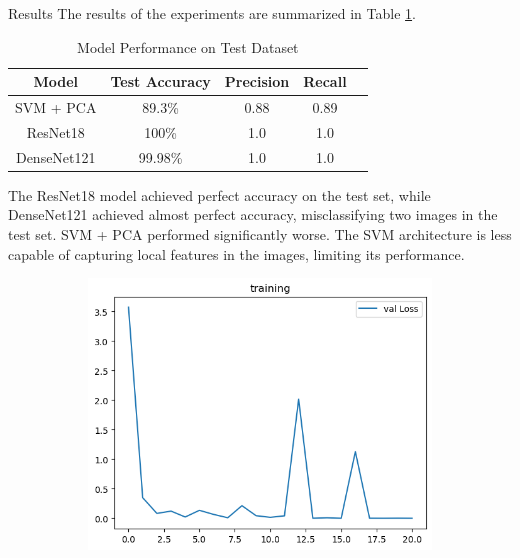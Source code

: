 \documentclass[12pt, a4paper]{article}
\begin{document}
\begin{section}{Results}
    The results of the experiments are summarized in Table \ref{tab:results}. 
    \begin{table}[H]
        \centering
        \caption{Model Performance on Test Dataset}
        \label{tab:results}
        \begin{tabular}{|c|c|c|c|c|}
            \hline
            Model & Test Accuracy & Precision & Recall \\
            \hline
            SVM + PCA & 89.3\%& 0.88 & 0.89 \\
            ResNet18 &100\% & 1.0 & 1.0 \\
            DenseNet121 & 99.98\% & 1.0 & 1.0  \\
            \hline
        \end{tabular}
    \end{table}
    The ResNet18 model achieved perfect accuracy on the test set, while DenseNet121 achieved almost perfect accuracy, misclassifying two images in the test set. SVM + PCA performed significantly worse. The SVM architecture is less capable of capturing local features in the images, limiting its performance.
    \begin{figure}[H]
        \centering
        \begin{subfigure}[b]{0.45\textwidth}
            \centering
            \includegraphics[width=\textwidth]{../plots/ResNet18_training.png}

\end{subfigure}
\end{figure}
\end{section}
\end{document}
